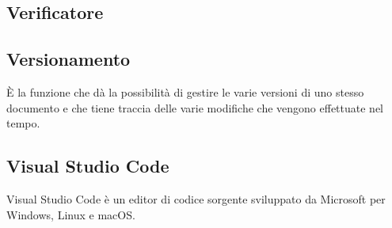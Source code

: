 
\subsection*{Verificatore}

\subsection*{Versionamento}
È la funzione che dà la possibilità di gestire le varie versioni di uno stesso documento e che tiene
traccia delle varie modifiche che vengono effettuate nel tempo.

\subsection*{Visual Studio Code}
Visual Studio Code è un editor di codice sorgente sviluppato da Microsoft per Windows, Linux e macOS.

